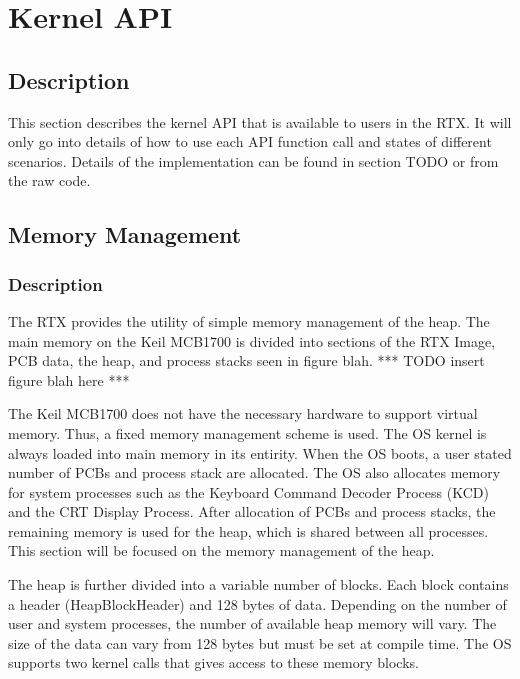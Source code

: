 \documentclass[12pt,twocolumn]{report}
\begin{document}
\chapter{Kernel API}
\section{Description}
This section describes the kernel API that is available to users in the RTX. It will only go into details of how to use each API function call and states of different scenarios. Details of the implementation can be found in section TODO or from the raw code.

\section{Memory Management}
\subsection{Description}
The RTX provides the utility of simple memory management of the heap. The main memory on the Keil MCB1700 is divided into sections of the RTX Image, PCB data, the heap, and process stacks seen in figure blah.
*** TODO insert figure blah here ***

The Keil MCB1700 does not have the necessary hardware to support virtual memory. Thus, a fixed memory management scheme is used. The OS kernel is always loaded into main memory in its entirity. When the OS boots, a user stated number of PCBs and process stack are allocated. The OS also allocates memory for system processes such as the Keyboard Command Decoder Process (KCD) and the CRT Display Process. After allocation of PCBs and process stacks, the remaining memory is used for the heap, which is shared between all processes. This section will be focused on the memory management of the heap.

The heap is further divided into a variable number of blocks. Each block contains a header (HeapBlockHeader) and 128 bytes of data. Depending on the number of user and system processes, the number of available heap memory will vary. The size of the data can vary from 128 bytes but must be set at compile time. The OS supports two kernel calls that gives access to these memory blocks.
\end{document}
